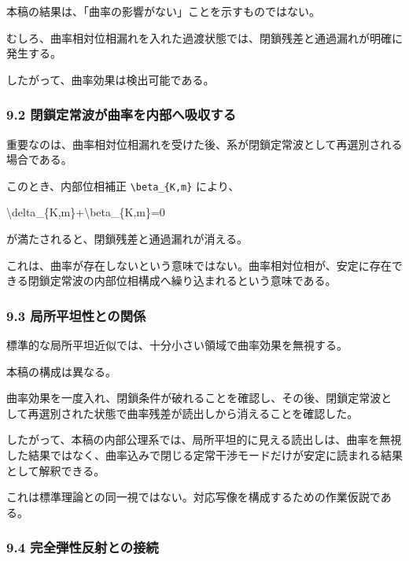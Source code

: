 \documentclass[
  a4paper,
]{article}
\newenvironment{Shaded}{}{}
\newcommand{\NormalTok}[1]{#1}
\begin{document}
本稿の結果は、「曲率の影響がない」ことを示すものではない。

むしろ、曲率相対位相漏れを入れた過渡状態では、閉鎖残差と通過漏れが明確に発生する。

したがって、曲率効果は検出可能である。

\subsubsection{9.2
閉鎖定常波が曲率を内部へ吸収する}\label{ux9589ux9396ux5b9aux5e38ux6ce2ux304cux66f2ux7387ux3092ux5185ux90e8ux3078ux5438ux53ceux3059ux308b}

重要なのは、曲率相対位相漏れを受けた後、系が閉鎖定常波として再選別される場合である。

このとき、内部位相補正 \texttt{\textbackslash{}beta\_\{K,m\}} により、

\begin{Shaded}
\begin{Highlighting}[]
\NormalTok{\textbackslash{}delta\_\{K,m\}+\textbackslash{}beta\_\{K,m\}=0}
\end{Highlighting}
\end{Shaded}

が満たされると、閉鎖残差と通過漏れが消える。

これは、曲率が存在しないという意味ではない。曲率相対位相が、安定に存在できる閉鎖定常波の内部位相構成へ繰り込まれるという意味である。

\subsubsection{9.3
局所平坦性との関係}\label{ux5c40ux6240ux5e73ux5766ux6027ux3068ux306eux95a2ux4fc2}

標準的な局所平坦近似では、十分小さい領域で曲率効果を無視する。

本稿の構成は異なる。

曲率効果を一度入れ、閉鎖条件が破れることを確認し、その後、閉鎖定常波として再選別された状態で曲率残差が読出しから消えることを確認した。

したがって、本稿の内部公理系では、局所平坦的に見える読出しは、曲率を無視した結果ではなく、曲率込みで閉じる定常干渉モードだけが安定に読まれる結果として解釈できる。

これは標準理論との同一視ではない。対応写像を構成するための作業仮説である。

\subsubsection{9.4
完全弾性反射との接続}\label{ux5b8cux5168ux5f3eux6027ux53cdux5c04ux3068ux306eux63a5ux7d9a}
\end{document}
